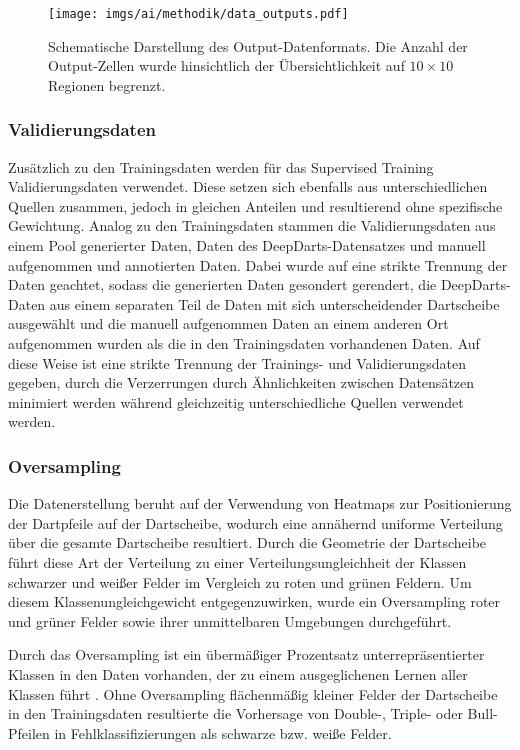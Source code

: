 \begin{figure}
    \centering
    \texttt{[image: imgs/ai/methodik/data\_outputs.pdf]}
    \caption{Schematische Darstellung des Output-Datenformats. Die Anzahl der Output-Zellen wurde hinsichtlich der Übersichtlichkeit auf $10 \times 10$ Regionen begrenzt.}
    \label{img:datenformat}
\end{figure}

\subsubsection{Validierungsdaten}
\label{sec:validierungsdaten}

Zusätzlich zu den Trainingsdaten werden für das Supervised Training Validierungsdaten verwendet. Diese setzen sich ebenfalls aus unterschiedlichen Quellen zusammen, jedoch in gleichen Anteilen und resultierend ohne spezifische Gewichtung. Analog zu den Trainingsdaten stammen die Validierungsdaten aus einem Pool generierter Daten, Daten des DeepDarts-Datensatzes und manuell aufgenommen und annotierten Daten. Dabei wurde auf eine strikte Trennung der Daten geachtet, sodass die generierten Daten gesondert gerendert, die DeepDarts-Daten aus einem separaten Teil de Daten mit sich unterscheidender Dartscheibe ausgewählt und die manuell aufgenommen Daten an einem anderen Ort aufgenommen wurden als die in den Trainingsdaten vorhandenen Daten. Auf diese Weise ist eine strikte Trennung der Trainings- und Validierungsdaten gegeben, durch die Verzerrungen durch Ähnlichkeiten zwischen Datensätzen minimiert werden während gleichzeitig unterschiedliche Quellen verwendet werden.

\subsubsection{Oversampling}
\label{sec:oversampling}

Die Datenerstellung beruht auf der Verwendung von Heatmaps zur Positionierung der Dartpfeile auf der Dartscheibe, wodurch eine annähernd uniforme Verteilung über die gesamte Dartscheibe resultiert. Durch die Geometrie der Dartscheibe führt diese Art der Verteilung zu einer Verteilungsungleichheit der Klassen schwarzer und weißer Felder im Vergleich zu roten und grünen Feldern. Um diesem Klassenungleichgewicht entgegenzuwirken, wurde ein Oversampling roter und grüner Felder sowie ihrer unmittelbaren Umgebungen durchgeführt.

Durch das Oversampling ist ein übermäßiger Prozentsatz unterrepräsentierter Klassen in den Daten vorhanden, der zu einem ausgeglichenen Lernen aller Klassen führt \cite{oversampling}. Ohne Oversampling flächenmäßig kleiner Felder der Dartscheibe in den Trainingsdaten resultierte die Vorhersage von Double-, Triple- oder Bull-Pfeilen in Fehlklassifizierungen als schwarze bzw. weiße Felder.

